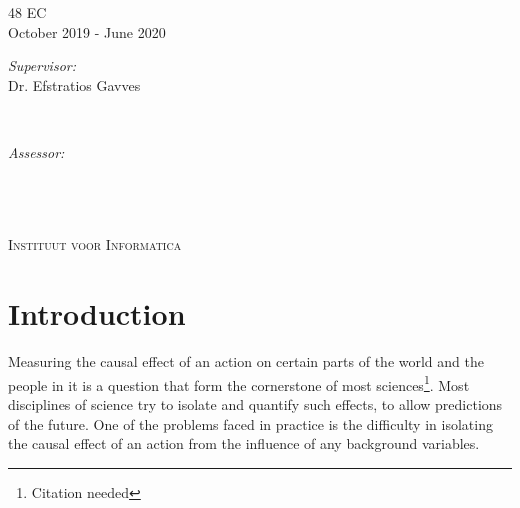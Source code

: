 \documentclass{report}
\newcommand{\red}[1]{{\color{red}{#1}}}
\begin{document}
\begin{titlepage}
48 EC\\ %
October 2019 - June 2020\\[1cm]%

\begin{minipage}[t]{0.4\textwidth}
\begin{flushleft} \large
\emph{Supervisor:} \\
Dr. Efstratios Gavves%
\end{flushleft}
\end{minipage}
~
\begin{minipage}[t]{0.4\textwidth}
\begin{flushright} \large
\emph{Assessor:} \\
\red{Dr A  \textsc{Person}}\\
\end{flushright}
\end{minipage}\\[2cm]


\framebox{\rule{0pt}{2.5cm}\rule{2.5cm}{0pt}}\\[0.5cm]
\textsc{\large Instituut voor Informatica}\\[1.0cm] %
 

\vfill %

\end{titlepage}


\tableofcontents


\chapter{Introduction}
Measuring the causal effect of an action on certain parts of the world and the people in it is a question that form the cornerstone of most sciences\footnote{\label{note:citation}Citation needed}. Most disciplines of science try to isolate and quantify such effects, to allow predictions of the future. One of the problems faced in practice is the difficulty in isolating the causal effect of an action from the influence of any background variables. 
\end{document}
